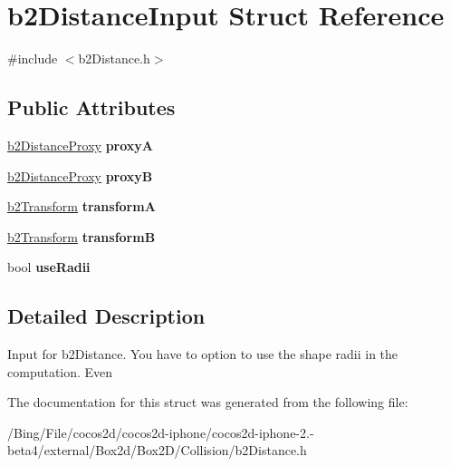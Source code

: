 \hypertarget{structb2_distance_input}{\section{b2\-Distance\-Input Struct Reference}
\label{structb2_distance_input}
}


{\ttfamily \#include $<$b2\-Distance.\-h$>$}

\subsection*{Public Attributes}
\begin{DoxyCompactItemize}
\item 
\hypertarget{structb2_distance_input_a84d378f4f0e2f06fbe03d413e9dfbbd9}{\hyperlink{structb2_distance_proxy}{b2\-Distance\-Proxy} {\bfseries proxy\-A}}\label{structb2_distance_input_a84d378f4f0e2f06fbe03d413e9dfbbd9}

\item 
\hypertarget{structb2_distance_input_ad08521a9cdf9d418ececfd44de83a5d3}{\hyperlink{structb2_distance_proxy}{b2\-Distance\-Proxy} {\bfseries proxy\-B}}\label{structb2_distance_input_ad08521a9cdf9d418ececfd44de83a5d3}

\item 
\hypertarget{structb2_distance_input_a0889c2f7120ba521d6e40e2a22834ddb}{\hyperlink{structb2_transform}{b2\-Transform} {\bfseries transform\-A}}\label{structb2_distance_input_a0889c2f7120ba521d6e40e2a22834ddb}

\item 
\hypertarget{structb2_distance_input_a47352d7c5b3db80b2fb8cf338f1c1895}{\hyperlink{structb2_transform}{b2\-Transform} {\bfseries transform\-B}}\label{structb2_distance_input_a47352d7c5b3db80b2fb8cf338f1c1895}

\item 
\hypertarget{structb2_distance_input_ab72a770be4a91997d00112409de5fea7}{bool {\bfseries use\-Radii}}\label{structb2_distance_input_ab72a770be4a91997d00112409de5fea7}

\end{DoxyCompactItemize}


\subsection{Detailed Description}
Input for b2\-Distance. You have to option to use the shape radii in the computation. Even 

The documentation for this struct was generated from the following file\-:\begin{DoxyCompactItemize}
\item 
/\-Bing/\-File/cocos2d/cocos2d-\/iphone/cocos2d-\/iphone-\/2.-\/beta4/external/\-Box2d/\-Box2\-D/\-Collision/b2\-Distance.\-h\end{DoxyCompactItemize}
